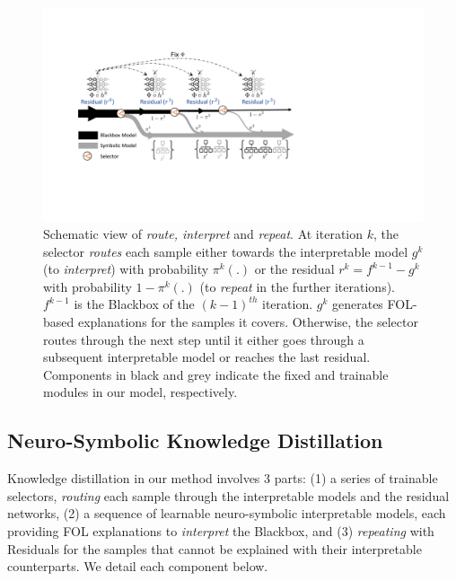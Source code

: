 \begin{figure}[t]
\begin{center}
\centerline{\includegraphics[width=\columnwidth]{figures/main/Schematic.pdf}}
\caption{Schematic view of \emph{route, interpret} and \emph{repeat}. At iteration $k$, the selector \emph{routes} each sample either towards the interpretable model $g^k$ (to \emph{interpret}) with probability $\pi^k(.)$ or the residual $r^k = f^{k-1} - g^k$ with probability $1-\pi^k(.)$ (to 
\emph{repeat} in the further iterations). 
$f^{k-1}$ is the Blackbox of the $(k-1)^{th}$ iteration. $g^k$ generates FOL-based explanations for the samples it covers. 
Otherwise, the selector routes through the next step until it either goes through a subsequent interpretable model or reaches the last residual. 
Components in black and grey indicate the fixed and trainable modules in our model, respectively.
}
\label{fig:Schematic} 
\end{center}
\vskip -0.2in
\end{figure}

\subsection{Neuro-Symbolic Knowledge Distillation}
Knowledge distillation in our method involves 3 parts: (1) a series of trainable selectors, \emph{routing} each sample through the interpretable models and the residual networks, (2) a sequence of learnable neuro-symbolic interpretable models, each providing FOL explanations to \emph {interpret} the Blackbox, and (3) \emph{repeating} with Residuals for the samples that cannot be explained with their interpretable counterparts. 
We detail each component below.


